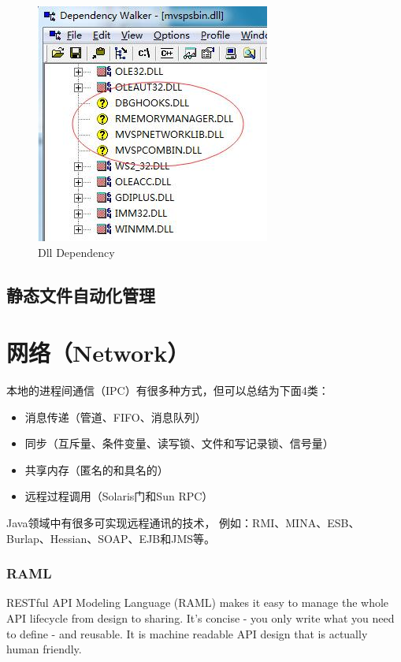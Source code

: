 \documentclass{book}
\begin{document}
\begin{figure}[htbp]
	\centering
	\includegraphics[scale=0.6]{AnalyseDllDependency.jpg}
	\caption{Dll Dependency}
	\label{fig:AnalyseDllDependency}
\end{figure}


\section{静态文件自动化管理}

\chapter{网络（Network）}

本地的进程间通信（IPC）有很多种方式，但可以总结为下面4类：

\begin{itemize}
	\item{消息传递（管道、FIFO、消息队列）}
	\item{同步（互斥量、条件变量、读写锁、文件和写记录锁、信号量）}
	\item{共享内存（匿名的和具名的）}
	\item{远程过程调用（Solaris门和Sun RPC）}
\end{itemize}

Java领域中有很多可实现远程通讯的技术，
例如：RMI、MINA、ESB、Burlap、Hessian、SOAP、EJB和JMS等。


\subsection{RAML}

RESTful API Modeling Language (RAML) makes it easy to 
manage the whole API lifecycle from design to sharing. 
It's concise - you only write what you need to define - and reusable. 
It is machine readable API design that is actually human friendly.
\end{document}
